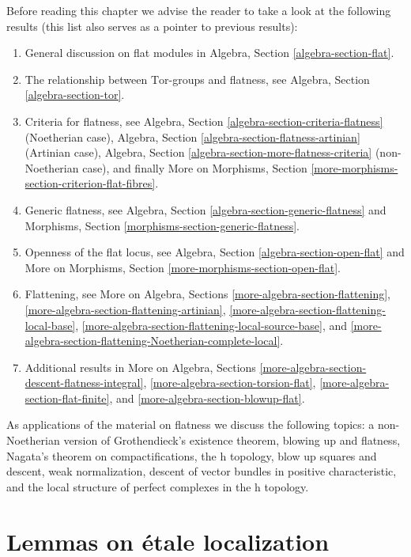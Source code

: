 \medskip\noindent
Before reading this chapter we advise the reader to take a look
at the following results (this list also serves as a pointer to
previous results):
\begin{enumerate}
\item General discussion on flat modules in
Algebra, Section \ref{algebra-section-flat}.
\item The relationship between $\text{Tor}$-groups and flatness, see
Algebra, Section \ref{algebra-section-tor}.
\item Criteria for flatness, see
Algebra, Section \ref{algebra-section-criteria-flatness}
(Noetherian case),
Algebra, Section \ref{algebra-section-flatness-artinian}
(Artinian case),
Algebra, Section \ref{algebra-section-more-flatness-criteria}
(non-Noetherian case), and finally
More on Morphisms, Section \ref{more-morphisms-section-criterion-flat-fibres}.
\item Generic flatness, see
Algebra, Section \ref{algebra-section-generic-flatness}
and
Morphisms, Section \ref{morphisms-section-generic-flatness}.
\item Openness of the flat locus, see
Algebra, Section \ref{algebra-section-open-flat}
and
More on Morphisms, Section \ref{more-morphisms-section-open-flat}.
\item Flattening, see
More on Algebra, Sections
\ref{more-algebra-section-flattening},
\ref{more-algebra-section-flattening-artinian},
\ref{more-algebra-section-flattening-local-base},
\ref{more-algebra-section-flattening-local-source-base}, and
\ref{more-algebra-section-flattening-Noetherian-complete-local}.
\item Additional results in
More on Algebra, Sections \ref{more-algebra-section-descent-flatness-integral},
\ref{more-algebra-section-torsion-flat},
\ref{more-algebra-section-flat-finite}, and
\ref{more-algebra-section-blowup-flat}.
\end{enumerate}
As applications of the material on flatness we discuss the following
topics: a non-Noetherian version of Grothendieck's existence theorem,
blowing up and flatness, Nagata's theorem on compactifications,
the h topology, blow up squares and descent, weak normalization,
descent of vector bundles in positive characteristic, and
the local structure of perfect complexes in the h topology.






\section{Lemmas on \'etale localization}
\label{section-etale-localization}

